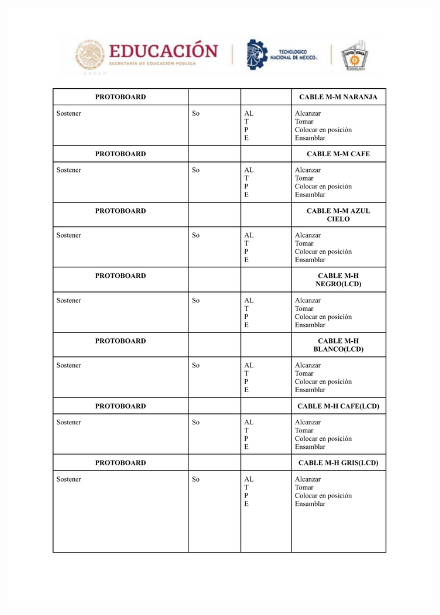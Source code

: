     \begin{figure}
        \centering
        \includegraphics[trim = {5mm 15mm 5mm 10mm},clip,scale=0.3]{24/Img/diagramaBimanual3.pdf}
        \caption{}
        \label{fig:Diagrama Bimanual3}
    \end{figure}
